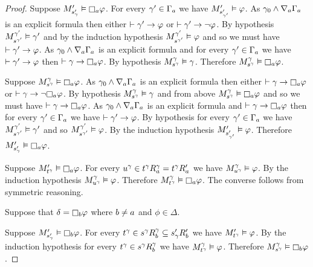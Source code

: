 \begin{proof}
Suppose $\kPModelP{\kStateSP_\gamma} \entails \necessaryA \phi$.
For every $\gamma' \in \Gamma_\agentA$ we have $\kPModelP{\kStateSP_{\gamma'}} \entails \phi$.
As $\gamma_0 \land \coversA \Gamma_\agentA$ is an explicit formula then either $\proves \gamma' \implies \phi$ or $\proves \gamma' \implies \lnot \phi$.
By hypothesis $\kPModel[\gamma']{\kStateS[\gamma']} \entails \gamma'$ and by the induction hypothesis $\kPModel[\gamma']{\kStateS[\gamma']} \entails \phi$ and so we must have $\proves \gamma' \implies \phi$.
As $\gamma_0 \land \coversA \Gamma_\agentA$ is an explicit formula and for every $\gamma' \in \Gamma_\agentA$ we have $\proves \gamma' \implies \phi$ then $\proves \gamma \implies \necessaryA \phi$.
By hypothesis $\kPModel[\gamma]{\kStateS[\gamma]} \entails \gamma$.
Therefore $\kPModel[\gamma]{\kStateS[\gamma]} \entails \necessaryA \phi$.

Suppose $\kPModel[\gamma]{\kStateS[\gamma]} \entails \necessaryA \phi$.
As $\gamma_0 \land \coversA \Gamma_\agentA$ is an explicit formula then either $\proves \gamma \implies \necessaryA \phi$ or $\proves \gamma \implies \lnot \necessaryA \phi$.
By hypothesis $\kPModel[\gamma]{\kStateS[\gamma]} \entails \gamma$ and from above $\kPModel[\gamma]{\kStateS[\gamma]} \entails \necessaryA \phi$ and so we must have $\proves \gamma \implies \necessaryA \phi$.
As $\gamma_0 \land \coversA \Gamma_\agentA$ is an explicit formula and $\proves \gamma \implies \necessaryA \phi$ then for every $\gamma' \in \Gamma_\agentA$ we have $\proves \gamma' \implies \phi$.
By hypothesis for every $\gamma' \in \Gamma_\agentA$ we have $\kPModel[\gamma']{\kStateS[\gamma']} \entails \gamma'$ and so $\kPModel[\gamma']{\kStateS[\gamma']} \entails \phi$.
By the induction hypothesis $\kPModelP{\kStateSP_{\gamma'}} \entails \phi$.
Therefore $\kPModelP{\kStateSP_\gamma} \entails \necessaryA \phi$.

Suppose $\kPModelP{\kStateT[\gamma]} \entails \necessaryA \phi$.
For every $\kStateU[\gamma] \in \kSuccessorsA[\gamma]{\kStateT[\gamma]} = \kSuccessorsPA{\kStateT[\gamma]}$ we have $\kPModel[\gamma]{\kStateU[\gamma]} \entails \phi$.
By the induction hypothesis $\kPModel[\gamma]{\kStateU[\gamma]} \entails \phi$.
Therefore $\kPModel[\gamma]{\kStateT[\gamma]} \entails \necessaryA \phi$.
The converse follows from symmetric reasoning.

Suppose that $\delta = \necessaryB \phi$ where $\agentB \neq \agentA$ and $\phi \in \Delta$.

Suppose $\kPModelP{\kStateSP_\gamma} \entails \necessaryB \phi$.
For every $\kStateT[\gamma] \in \kSuccessorsB[\gamma]{\kStateS[\gamma]} \subseteq \kSuccessorsPB{\kStateSP_\gamma}$ we have $\kPModelP{\kStateT[\gamma]} \entails \phi$.
By the induction hypothesis for every $\kStateT[\gamma] \in \kSuccessorsB[\gamma]{\kStateS[\gamma]}$ we have $\kPModel[\gamma]{\kStateT[\gamma]} \entails \phi$.
Therefore $\kPModel[\gamma]{\kStateS[\gamma]} \entails \necessaryB \phi$.


\end{proof}
